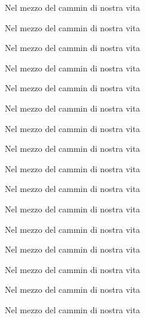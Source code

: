 \documentclass[11pt,b5paper,twoside]{book}
\begin{document}
\beginnumbering
\numberpstarttrue

\pstart{}
Nel mezzo del cammin di nostra vita
\pend

\pstart{}%
Nel mezzo del cammin di nostra vita
\pend

\pstart{}%
Nel mezzo del cammin di nostra vita
\pend

\pstart{}%
Nel mezzo del cammin di nostra vita
\pend

\pstart{}%
Nel mezzo del cammin di nostra vita
\pend

\pstart{}%
Nel mezzo del cammin di nostra vita
\pend

\pstart{}%
Nel mezzo del cammin di nostra vita
\pend

\pstart{}%
Nel mezzo del cammin di nostra vita
\pend

\pstart{}%
Nel mezzo del cammin di nostra vita
\pend

\pstart{}%
Nel mezzo del cammin di nostra vita
\pend

\pstart{}%
Nel mezzo del cammin di nostra vita
\pend

\pstart{}%
Nel mezzo del cammin di nostra vita
\pend

\pstart{}%
Nel mezzo del cammin di nostra vita
\pend

\pstart{}%
Nel mezzo del cammin di nostra vita
\pend

\pstart{}%
Nel mezzo del cammin di nostra vita
\pend

\pstart{}%
Nel mezzo del cammin di nostra vita
\pend

\numberpstartfalse
\endnumbering
\end{document}
